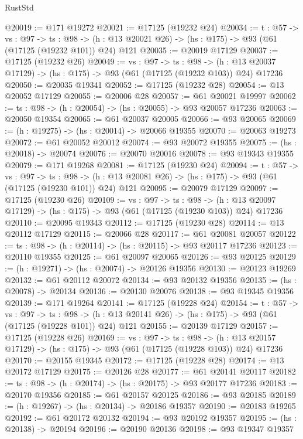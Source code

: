 \begin{lexlean}{RustStd}
\begin{coremodule}
@20019 := @171 @19272
@20021 := @17125 (@19232 @24)
@20034 := {t : @57} ->
  {vs : @97} ->
  {ts : @98} -> (h : @13 @20021 @26) -> (hs : @175) -> @93 (@61 (@17125 (@19232 @101)) @24) @121
@20035 := @20019 @17129
@20037 := @17125 (@19232 @26)
@20049 := {vs : @97} ->
  {ts : @98} ->
  (h : @13 @20037 @17129) -> (hs : @175) -> @93 (@61 (@17125 (@19232 @103)) @24) @17236
@20050 := @20035 @19341
@20052 := @17125 (@19232 @28)
@20054 := @13 @20052 @17129
@20055 := @20006 @28
@20057 := @61 @20021 @19997
@20062 := {ts : @98} -> (h : @20054) -> (hs : @20055) -> @93 @20057 @17236
@20063 := @20050 @19354
@20065 := @61 @20037 @20005
@20066 := @93 @20065
@20069 := (h : @19275) -> (hs : @20014) -> @20066 @19355
@20070 := @20063 @19273
@20072 := @61 @20052 @20012
@20074 := @93 @20072 @19355
@20075 := (hs : @20018) -> @20074
@20076 := @20070 @20016
@20078 := @93 @19343 @19355
@20079 := @171 @19268
@20081 := @17125 (@19230 @24)
@20094 := {t : @57} ->
  {vs : @97} ->
  {ts : @98} -> (h : @13 @20081 @26) -> (hs : @175) -> @93 (@61 (@17125 (@19230 @101)) @24) @121
@20095 := @20079 @17129
@20097 := @17125 (@19230 @26)
@20109 := {vs : @97} ->
  {ts : @98} ->
  (h : @13 @20097 @17129) -> (hs : @175) -> @93 (@61 (@17125 (@19230 @103)) @24) @17236
@20110 := @20095 @19343
@20112 := @17125 (@19230 @28)
@20114 := @13 @20112 @17129
@20115 := @20066 @28
@20117 := @61 @20081 @20057
@20122 := {ts : @98} -> (h : @20114) -> (hs : @20115) -> @93 @20117 @17236
@20123 := @20110 @19355
@20125 := @61 @20097 @20065
@20126 := @93 @20125
@20129 := (h : @19271) -> (hs : @20074) -> @20126 @19356
@20130 := @20123 @19269
@20132 := @61 @20112 @20072
@20134 := @93 @20132 @19356
@20135 := (hs : @20078) -> @20134
@20136 := @20130 @20076
@20138 := @93 @19345 @19356
@20139 := @171 @19264
@20141 := @17125 (@19228 @24)
@20154 := {t : @57} ->
  {vs : @97} ->
  {ts : @98} -> (h : @13 @20141 @26) -> (hs : @175) -> @93 (@61 (@17125 (@19228 @101)) @24) @121
@20155 := @20139 @17129
@20157 := @17125 (@19228 @26)
@20169 := {vs : @97} ->
  {ts : @98} ->
  (h : @13 @20157 @17129) -> (hs : @175) -> @93 (@61 (@17125 (@19228 @103)) @24) @17236
@20170 := @20155 @19345
@20172 := @17125 (@19228 @28)
@20174 := @13 @20172 @17129
@20175 := @20126 @28
@20177 := @61 @20141 @20117
@20182 := {ts : @98} -> (h : @20174) -> (hs : @20175) -> @93 @20177 @17236
@20183 := @20170 @19356
@20185 := @61 @20157 @20125
@20186 := @93 @20185
@20189 := (h : @19267) -> (hs : @20134) -> @20186 @19357
@20190 := @20183 @19265
@20192 := @61 @20172 @20132
@20194 := @93 @20192 @19357
@20195 := (hs : @20138) -> @20194
@20196 := @20190 @20136
@20198 := @93 @19347 @19357

\end{coremodule}
\end{lexlean}

